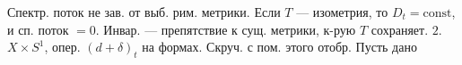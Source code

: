 Спектр. поток не зав. от выб. рим. метрики.
Если $T$ --- изометрия, то $D_t=\mathrm{const}$, и сп. поток $=0$.
Инвар. --- препятствие к сущ. метрики, к-рую $T$ сохраняет.
\textcircled{$2$}. $X\times S^1$, опер. $(d+\delta)_t$ на формах.
Скруч. с пом. этого отобр.
Пусть дано
\begin{center}\end{center}



